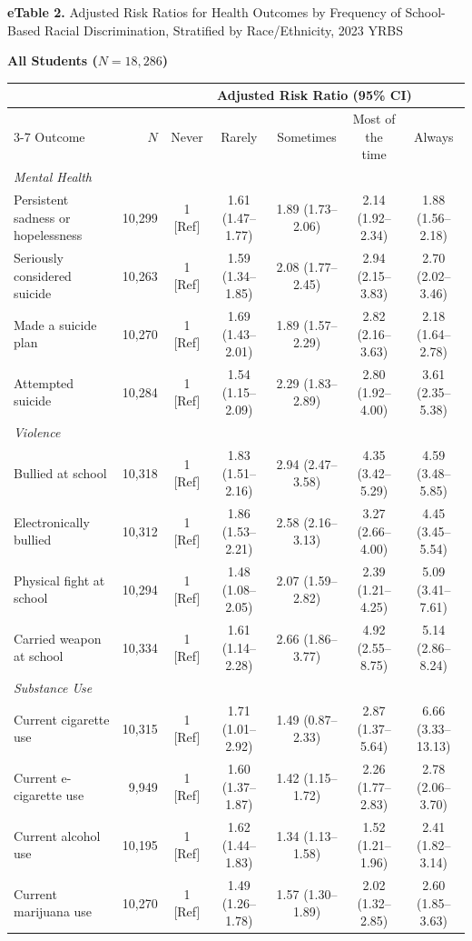 \documentclass[12pt]{article}
\begin{document}
\begin{landscape}
\footnotesize
\noindent\textbf{eTable 2.} Adjusted Risk Ratios for Health Outcomes by Frequency of School-Based Racial Discrimination, Stratified by Race/Ethnicity, 2023 YRBS\par
\vspace{6pt}
\nobreak\noindent\textbf{All Students ($N = 18,286$)}
\nopagebreak\par\nopagebreak\vspace{1pt}\nopagebreak
\nobreak\noindent\begin{tabular}{l r ccccc}
\toprule
 & & \multicolumn{5}{c}{Adjusted Risk Ratio (95\% CI)} \\
\cmidrule(lr){3-7}
Outcome & $N$ & Never & Rarely & Sometimes & Most of the time & Always \\
\midrule
\textit{Mental Health} \\
\quad Persistent sadness or hopelessness & 10,299 & 1 [Ref] & 1.61 (1.47--1.77) & 1.89 (1.73--2.06) & 2.14 (1.92--2.34) & 1.88 (1.56--2.18) \\
\quad Seriously considered suicide & 10,263 & 1 [Ref] & 1.59 (1.34--1.85) & 2.08 (1.77--2.45) & 2.94 (2.15--3.83) & 2.70 (2.02--3.46) \\
\quad Made a suicide plan & 10,270 & 1 [Ref] & 1.69 (1.43--2.01) & 1.89 (1.57--2.29) & 2.82 (2.16--3.63) & 2.18 (1.64--2.78) \\
\quad Attempted suicide & 10,284 & 1 [Ref] & 1.54 (1.15--2.09) & 2.29 (1.83--2.89) & 2.80 (1.92--4.00) & 3.61 (2.35--5.38) \\
\addlinespace[4pt]
\textit{Violence} \\
\quad Bullied at school & 10,318 & 1 [Ref] & 1.83 (1.51--2.16) & 2.94 (2.47--3.58) & 4.35 (3.42--5.29) & 4.59 (3.48--5.85) \\
\quad Electronically bullied & 10,312 & 1 [Ref] & 1.86 (1.53--2.21) & 2.58 (2.16--3.13) & 3.27 (2.66--4.00) & 4.45 (3.45--5.54) \\
\quad Physical fight at school & 10,294 & 1 [Ref] & 1.48 (1.08--2.05) & 2.07 (1.59--2.82) & 2.39 (1.21--4.25) & 5.09 (3.41--7.61) \\
\quad Carried weapon at school & 10,334 & 1 [Ref] & 1.61 (1.14--2.28) & 2.66 (1.86--3.77) & 4.92 (2.55--8.75) & 5.14 (2.86--8.24) \\
\addlinespace[4pt]
\textit{Substance Use} \\
\quad Current cigarette use & 10,315 & 1 [Ref] & 1.71 (1.01--2.92) & 1.49 (0.87--2.33) & 2.87 (1.37--5.64) & 6.66 (3.33--13.13) \\
\quad Current e-cigarette use & 9,949 & 1 [Ref] & 1.60 (1.37--1.87) & 1.42 (1.15--1.72) & 2.26 (1.77--2.83) & 2.78 (2.06--3.70) \\
\quad Current alcohol use & 10,195 & 1 [Ref] & 1.62 (1.44--1.83) & 1.34 (1.13--1.58) & 1.52 (1.21--1.96) & 2.41 (1.82--3.14) \\
\quad Current marijuana use & 10,270 & 1 [Ref] & 1.49 (1.26--1.78) & 1.57 (1.30--1.89) & 2.02 (1.32--2.85) & 2.60 (1.85--3.63) \\
\bottomrule
\end{tabular}\par\vspace{8pt}


\end{landscape}
\end{document}
